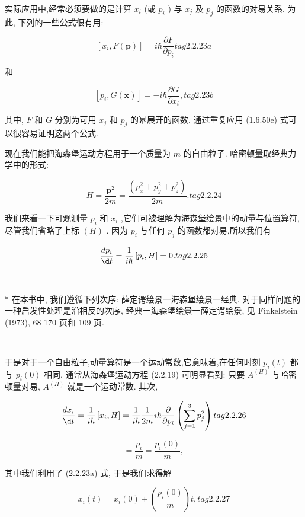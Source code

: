 \documentclass[lang=cn,newtx,10pt,scheme=chinese,thmcnt=section]{elegantbook}
\begin{document}
实际应用中,经常必须要做的是计算 ${x}_{i}$ (或 ${p}_{i}$ ) 与 ${x}_{j}$ 及 ${p}_{j}$ 的函数的对易关系. 为此, 下列的一些公式很有用:

$$
\left\lbrack {{x}_{i}, F\left( \mathbf{p}\right) }\right\rbrack = i\hbar \frac{\partial F}{\partial {p}_{i}} tag{2.2.23a}
$$

和

$$
\left\lbrack {{p}_{i}, G\left( \mathbf{x}\right) }\right\rbrack = - i\hbar \frac{\partial G}{\partial {x}_{i}}, tag{2.23b}
$$

其中, $F$ 和 $G$ 分别为可用 ${x}_{j}$ 和 ${p}_{j}$ 的幂展开的函数. 通过重复应用 (1.6.50e) 式可以很容易证明这两个公式.

现在我们能把海森堡运动方程用于一个质量为 $m$ 的自由粒子. 哈密顿量取经典力学中的形式:

$$
H = \frac{{\mathbf{p}}^{2}}{2m} = \frac{\left( {p}_{x}^{2} + {p}_{y}^{2} + {p}_{z}^{2}\right) }{2m}. tag{2.2.24}
$$

我们来看一下可观测量 ${p}_{i}$ 和 ${x}_{i}$ ,它们可被理解为海森堡绘景中的动量与位置算符,尽管我们省略了上标 $\left( H\right)$ . 因为 ${p}_{i}$ 与任何 ${p}_{j}$ 的函数都对易,所以我们有

$$
\frac{d{p}_{i}}{\d t} = \frac{1}{i\hbar }\left\lbrack {{p}_{i}, H}\right\rbrack = 0. tag{2.2.25}
$$

---

* 在本书中, 我们遵循下列次序: 薛定谔绘景一海森堡绘景一经典. 对于同样问题的一种启发性处理是沿相反的次序, 经典一海森堡绘景一薛定谔绘景, 见 Finkelstein (1973), 68 170 页和 109 页.

---

于是对于一个自由粒子,动量算符是一个运动常数,它意味着,在任何时刻 ${p}_{i}\left( t\right)$ 都与 ${p}_{i}\left( 0\right)$ 相同. 通常从海森堡运动方程 (2.2.19) 可明显看到: 只要 ${A}^{\left( H\right) }$ 与哈密顿量对易, ${A}^{\left( H\right) }$ 就是一个运动常数. 其次,

$$
\frac{d{x}_{i}}{\d t} = \frac{1}{i\hbar }\left\lbrack {{x}_{i}, H}\right\rbrack = \frac{1}{i\hbar }\frac{1}{2m}i\hbar \frac{\partial }{\partial {p}_{i}}\left( {\mathop{\sum }\limits_{{j = 1}}^{3}{p}_{j}^{2}}\right) tag{2.2.26}
$$

$$
= \frac{{p}_{i}}{m} = \frac{{p}_{i}\left( 0\right) }{m},
$$

其中我们利用了 (2.2.23a) 式, 于是我们求得解

$$
{x}_{i}\left( t\right) = {x}_{i}\left( 0\right) + \left( \frac{{p}_{i}\left( 0\right) }{m}\right) t, tag{2.2.27}
$$
\end{document}
